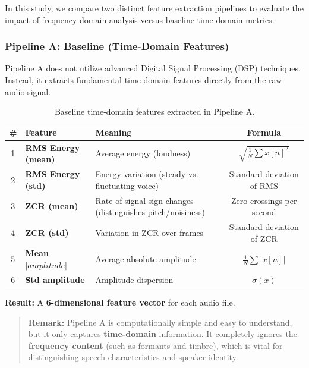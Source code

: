In this study, we compare two distinct feature extraction pipelines to evaluate the impact of frequency-domain analysis versus baseline time-domain metrics.

\subsubsection*{Pipeline A: Baseline (Time-Domain Features)}

Pipeline A does not utilize advanced Digital Signal Processing (DSP) techniques. Instead, it extracts fundamental time-domain features directly from the raw audio signal. 

\begin{table}[ht]
\centering
\renewcommand{\arraystretch}{1.5}
\begin{tabular}{|c|l|p{5cm}|c|}
\hline
\textbf{\#} & \textbf{Feature} & \textbf{Meaning} & \textbf{Formula} \\ \hline
1 & \textbf{RMS Energy (mean)} & Average energy (loudness) & $\sqrt{\frac{1}{N}\sum x[n]^2}$ \\ \hline
2 & \textbf{RMS Energy (std)} & Energy variation (steady vs. fluctuating voice) & Standard deviation of RMS \\ \hline
3 & \textbf{ZCR (mean)} & Rate of signal sign changes (distinguishes pitch/noisiness) & Zero-crossings per second \\ \hline
4 & \textbf{ZCR (std)} & Variation in ZCR over frames & Standard deviation of ZCR \\ \hline
5 & \textbf{Mean $|amplitude|$} & Average absolute amplitude & $\frac{1}{N}\sum |x[n]|$ \\ \hline
6 & \textbf{Std amplitude} & Amplitude dispersion & $\sigma(x)$ \\ \hline
\end{tabular}
\caption{Baseline time-domain features extracted in Pipeline A.}
\label{tab:pipeline_a}
\end{table}

\textbf{Result:} A \textbf{6-dimensional feature vector} for each audio file.

\begin{quote}
\textbf{Remark:} Pipeline A is computationally simple and easy to understand, but it only captures \textbf{time-domain} information. It completely ignores the \textbf{frequency content} (such as formants and timbre), which is vital for distinguishing speech characteristics and speaker identity.
\end{quote}

